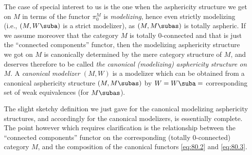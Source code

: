 The case of special interest to us is the one when the asphericity
structure we get on $M$ in terms of the functor $\pi_0^M$ is
\emph{modelizing}, hence even strictly modelizing (i.e., $(M,W\suba)$
is a strict modelizer), as $(M,M\subas)$ is totally aspheric. If we
assume moreover that the category $M$ is totally $0$-connected and
that \piz{} is just the ``connected components'' functor, then the
modelizing asphericity structure we got on $M$ is canonically
determined by the mere category structure of $M$, and deserves
therefore to be called \emph{the canonical \textup(modelizing\textup)
  asphericity structure on $M$}. A \emph{canonical modelizer} $(M,W)$
is a modelizer which can be obtained from a canonical asphericity
structure $(M,M\subas)$ by $W=W\suba=$ corresponding set of weak
equivalences (for $M\subas$).

\begin{remark}
  The slight sketchy definition we just gave for the canonical
  modelizing asphericity structures, and accordingly for the canonical
  modelizers, is essentially complete. The point however which
  requires clarification is the relationship between the ``connected
  components'' functor on the corresponding (totally $0$-connected)
  category $M$, and the composition of the canonical functors
  \eqref{eq:80.2} and \eqref{eq:80.3}.
\end{remark}

\bigbreak

\presectionfill{}\par

